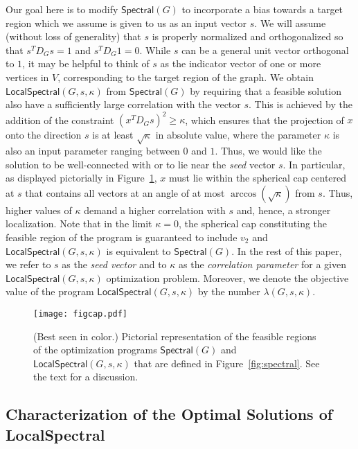 \documentclass[11pt]{article}
\begin{document}
Our goal here is to modify $\mathsf{Spectral}(G)$ to incorporate a bias 
towards a target region which we assume is given to us as an input vector $s$.
We will assume (without loss of generality) that $s$ is properly normalized 
and orthogonalized so that $s^T D_{G} s =1$ and $s^T D_{G} 1 =0$. 
While $s$ can be a general unit vector orthogonal to $1$, it may be helpful 
to think of $s$ as the indicator vector of one or more vertices in $V$, 
corresponding to the target region of the graph.
We obtain $\textsf{LocalSpectral}(G,s,\kappa)$ from $\mathsf{Spectral}(G)$ 
by requiring that a feasible solution also have a sufficiently large 
correlation with the vector $s$. 
This is achieved by the addition of the constraint 
$(x^T D_{G} s)^2 \geq \kappa$, which ensures that the projection of $x$ onto 
the direction $s$ is at least $\sqrt{\kappa}$ in absolute value, where the 
parameter $\kappa$ is also an input parameter ranging between $0$ and $1$. 
Thus, we would like the solution to be well-connected with or to lie near 
the \emph{seed} vector $s$. 
In particular, as displayed pictorially in Figure~\ref{fig:sphere}, $x$ must 
lie within the spherical cap centered at $s$ that contains all vectors at an 
angle of at most $\arccos(\sqrt{\kappa})$ from $s$. 
Thus, higher values of $\kappa$ demand a higher correlation with $s$ and, 
hence, a stronger localization. 
Note that in the limit $\kappa = 0$, the spherical cap constituting the 
feasible region of the program is guaranteed to include $v_2$ and 
$\textsf{LocalSpectral}(G,s,\kappa)$ is equivalent to $\mathsf{Spectral}(G)$. 
In the rest of this paper, we refer to $s$ as the \emph{seed vector} and to 
$\kappa$ as the \emph{correlation parameter} for a given 
$\textsf{LocalSpectral}(G,s,\kappa)$ optimization problem.  
Moreover, we denote the objective value of the program
$\textsf{LocalSpectral}(G,s,\kappa)$ by the number $\lambda(G,s,\kappa)$. 

\begin{figure}[h]
\begin{center}
   \texttt{[image: figcap.pdf]}
   \end{center}
\caption{(Best seen in color.) Pictorial representation of the feasible 
regions of the optimization programs $\mathsf{Spectral}(G)$ and 
$\textsf{LocalSpectral}(G,s,\kappa)$ that are defined in 
Figure~\ref{fig:spectral}.  See the text for a discussion.}
\label{fig:sphere}	
\end{figure}


\subsection{Characterization of the Optimal Solutions of \textsf{LocalSpectral}}
\label{sxn:optimize-theory}
\end{document}
